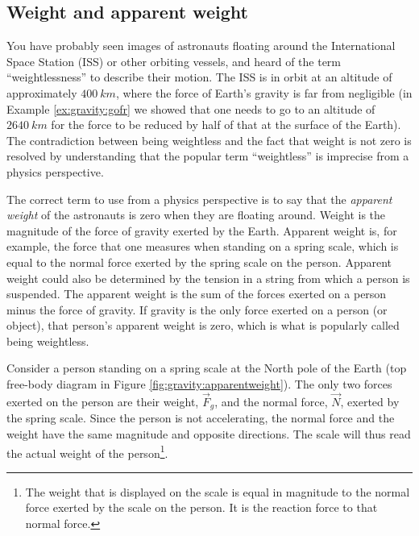 \subsection{Weight and apparent weight}
You have probably seen images of astronauts floating around the International Space Station (ISS) or other orbiting vessels, and heard of the term ``weightlessness''  to describe their motion. The ISS is in orbit at an altitude of approximately $\SI{400}{km}$, where the force of Earth's gravity is far from negligible (in Example \ref{ex:gravity:gofr} we showed that one needs to go to an altitude of $\SI{2640}{km}$ for the force to be reduced by half of that at the surface of the Earth). The contradiction between being weightless and the fact that weight is not zero is resolved by understanding that the popular term ``weightless'' is imprecise from a physics perspective.

The correct term to use from a physics perspective is to say that the \textit{apparent weight} of the astronauts is zero when they are floating around. Weight is the magnitude of the force of gravity exerted by the Earth. Apparent weight is, for example, the force that one measures when standing on a spring scale, which is equal to the normal force exerted by the spring scale on the person. Apparent weight could also be determined by the tension in a string from which a person is suspended. The apparent weight is the sum of the forces exerted on a person minus the force of gravity. If gravity is the only force exerted on a person (or object), that person's apparent weight is zero, which is what is popularly called being weightless.

Consider a person standing on a spring scale at the North pole of the Earth (top free-body diagram in Figure \ref{fig:gravity:apparentweight}). The only two forces exerted on the person are their weight, $\vec F_g$, and the normal force, $\vec N$, exerted by the spring scale. Since the person is not accelerating, the normal force and the weight have the same magnitude and opposite directions. The scale will thus read the actual weight of the person\footnote{The weight that is displayed on the scale is equal in magnitude to the normal force exerted by the scale on the person. It is the reaction force to that normal force.}.


